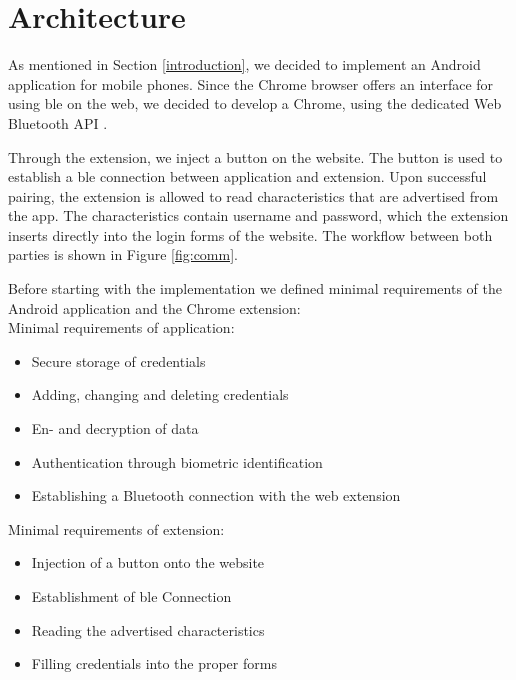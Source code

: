 \section{Architecture} \label{architecture}
As mentioned in Section \ref{introduction}, we decided to implement an Android application for mobile phones. Since the Chrome browser offers an interface for using \gls{ble} on the web, we decided to develop a Chrome, using the dedicated Web Bluetooth API \cite{WebBTAPI}.

Through the extension, we inject a button on the website. The button is used to establish a \gls{ble} connection between application and extension. Upon successful pairing, the extension is allowed to read characteristics that are advertised from the app. The characteristics contain username and password, which the extension inserts directly into the login forms of the website. The workflow between both parties is shown in Figure \ref{fig:comm}.

\noindent Before starting with the implementation we defined minimal requirements of the Android application and the Chrome extension: \\

\noindent Minimal requirements of application:
\begin{itemize}
\item Secure storage of credentials
\item Adding, changing and deleting credentials
\item En- and decryption of data 
\item Authentication through biometric identification
\item Establishing a Bluetooth connection with the web extension
\end{itemize}
\vspace{0.3cm}
\noindent Minimal requirements of extension:
\begin{itemize}
\item Injection of a button onto the website
\item Establishment of \gls{ble} Connection
\item Reading the advertised characteristics
\item Filling credentials into the proper forms
\end{itemize}

